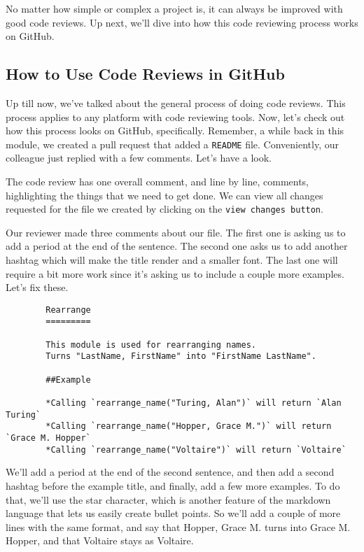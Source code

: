 	No matter how simple or complex a project is, it can always be improved with good code reviews. Up next, we'll dive into how this code reviewing process works on GitHub.
	
	\subsection{How to Use Code Reviews in GitHub}
	
	
	Up till now, we've talked about the general process of doing code reviews. This process applies to any platform with code reviewing tools. Now, let's check out how this process looks on GitHub, specifically. Remember, a while back in this module, we created a pull request that added a \texttt{README} file. Conveniently, our colleague just replied with a few comments. Let's have a look.
	
	The code review has one overall comment, and line by line, comments, highlighting the things that we need to get done. We can view all changes requested for the file we created by clicking on the \texttt{view changes button}.
	
	Our reviewer made three comments about our file. 
	The first one is asking us to add a period at the end of the sentence.
	The second one asks us to add another hashtag which will make the title render and a smaller font. 
	The last one will require a bit more work since it's asking us to include a couple more examples. Let's fix these.
	
	
	\begin{verbatim}
		Rearrange
		=========
		
		This module is used for rearranging names.
		Turns "LastName, FirstName" into "FirstName LastName".
		
		##Example
		
		*Calling `rearrange_name("Turing, Alan")` will return `Alan Turing`	
		*Calling `rearrange_name("Hopper, Grace M.")` will return `Grace M. Hopper`	
		*Calling `rearrange_name("Voltaire")` will return `Voltaire`	
	\end{verbatim}
	
	
	We'll add a period at the end of the second sentence, and then add a second hashtag before the example title, and finally, add a few more examples. To do that, we'll use the star character, which is another feature of the markdown language that lets us easily create bullet points. So we'll add a couple of more lines with the same format, and say that Hopper, Grace M. turns into Grace M. Hopper, and that Voltaire stays as Voltaire.
	

